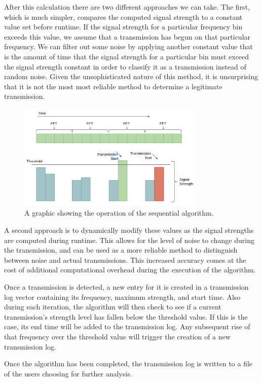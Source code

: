 \documentclass[conference]{IEEEtran}
\begin{document}
After this calculation there are two different approaches we can take. The first,
which is much simpler, compares the computed signal strength to a constant value
set before runtime. If the signal strength for a particular frequency bin exceeds
this value, we assume that a transmission has begun on that particular frequency.
We can filter out some noise by applying another constant value that is the 
amount of time that the signal strength for a particular bin must exceed the 
signal strength constant in order to classify it as a transmission instead of 
random noise.
Given the unsophisticated nature of this method, it is unsurprising that it is not
the most most reliable method to determine a legitimate transmission.

\begin{figure}[ht!]
\centering
\includegraphics[width=3.5in]{sequentialgraphic.png}
\caption{A graphic showing the operation of the sequential algorithm.}
\label{fig:pipeline}
\end{figure}

A second approach is to dynamically modify these values as the signal strengths
are computed during runtime. This allows for the level of noise to change during
the transmission, and can be used as a more reliable method to distinguish between
noise and actual transmissions. This increased accuracy comes at the cost of
additional computational overhead during the execution of the algorithm.

Once a transmission is detected, a new entry for it is created in a transmission log vector
containing its frequency, maximum strength, and start time. Also during each iteration,
the algorithm will then check to see if a current transmission's strength level
has fallen below the threshold value. If this is the case, its end time will
be added to the transmission log. Any subsequent rise of that frequency over the
threshold value will trigger the creation of a new transmission log.

Once the algorithm has been completed, the transmission log is written to a file
of the users choosing for further analysis.
\end{document}
